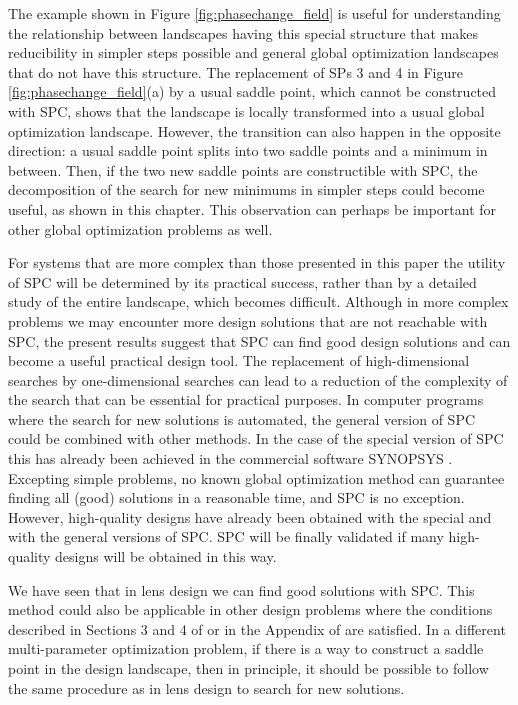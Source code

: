 The example shown in Figure \ref{fig:phasechange_field} is useful for understanding the relationship between landscapes having this special structure that makes reducibility in simpler steps possible and general global optimization landscapes that do not have this structure. The replacement of SPs 3 and 4 in Figure \ref{fig:phasechange_field}(a) by a usual saddle point, which cannot be constructed with SPC, shows that the landscape is locally transformed into a usual global optimization landscape. However, the transition can also happen in the opposite direction: a usual saddle point splits into two saddle points and a minimum in between. Then, if the two new saddle points are constructible with SPC, the decomposition of the search for new minimums in simpler steps could become useful, as shown in this chapter. This observation can perhaps be important for other global optimization problems as well.

For systems that are more complex than those presented in this paper the utility of SPC will be determined by its practical success, rather than by a detailed study of the entire landscape, which becomes difficult. Although in more complex problems we may encounter more design solutions that are not reachable with SPC, the present results suggest that SPC can find good design solutions and can become a useful practical design
tool. The replacement of high-dimensional searches by one-dimensional searches can lead to a reduction of the complexity of the search that can be essential for practical purposes. In computer programs where the search for new solutions is automated, the general version of SPC could be combined with other methods. In the case of the special version of SPC this has already been achieved in the commercial software SYNOPSYS \cite{DilworthSP2012}. Excepting simple problems, no known global optimization method can guarantee finding all (good) solutions in a reasonable time, and SPC is no exception. However, high-quality designs have already been obtained with the special \cite{MarinescuSP2008}\cite{BociortPatent2010} and with the general versions \cite{LivshitsSP2014} of SPC. SPC will be finally validated if many high-quality designs will be obtained in this way.

We have seen that in lens design we can find good solutions with SPC. This method could also be applicable in other design problems where the conditions described in Sections 3 and 4 of \cite{MVTurnhoutSPC15} or in the Appendix of \cite{BociortToyModel2010} are satisfied. In a different multi-parameter optimization problem, if there is a way to construct a
saddle point in the design landscape, then in principle, it should be possible to follow the same procedure as in lens design to search for new solutions.




